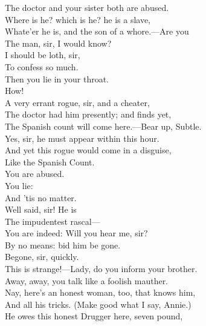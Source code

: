 \documentclass[a4paper,oneside,12pt]{memoir}
\begin{document}
\begin{drama*}
The doctor and your sister both are abused.\\
\kastrilspeaks Where is he? which is he? he is a slave,\\
Whate'er he is, and the son of a whore.---Are you\\
The man, sir, I would know?\\
\surlyspeaks {} I should be loth, sir,\\
To confess so much.\\
\kastrilspeaks {} Then you lie in your throat.\\
\surlyspeaks {} How!\\
\facespeaks A very errant rogue, sir, and a cheater,\\
The doctor had him presently; and finds yet,\\
The Spanish count will come here.---Bear up, Subtle.\\
\subtlespeaks Yes, sir, he must appear within this hour.\\
\facespeaks And yet this rogue would come in a disguise,\\
Like the Spanish Count.\\
\surlyspeaks {} You are abused.\\
\kastrilspeaks {} You lie:\\
And 'tis no matter.\\
\facespeaks {} Well said, sir! He is\\
The impudentest rascal---\\
\surlyspeaks {} You are indeed: Will you hear me, sir?\\
\facespeaks By no means: bid him be gone.\\
\kastrilspeaks {} Begone, sir, quickly.\\
\surlyspeaks This is strange!---Lady, do you inform your brother.\\
\kastrilspeaks Away, away, you talk like a foolish mauther.\\
\facespeaks Nay, here's an honest woman, too, that knows him,\\
And all his tricks. (Make good what I say, Annie.)\\
He owes this honest Drugger here, seven pound,\\

\end{drama*}
\end{document}

